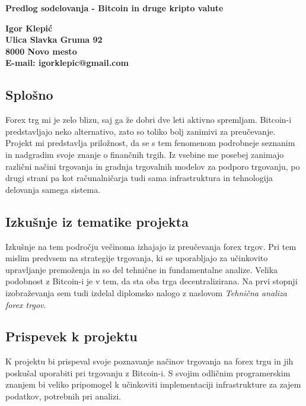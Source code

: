 \documentclass[10pt]{article}
\date{}
\begin{document}
\begin{flushleft}

{\Large
\textbf{Predlog sodelovanja - Bitcoin in druge kripto valute}
}


\vspace{5mm}

\bf Igor Klepić\\Ulica Slavka Gruma 92\\8000 Novo mesto
\\
E-mail: igorklepic@gmail.com
\end{flushleft}

\subsection*{Splošno}

Forex trg mi je zelo blizu, saj ga že dobri dve leti aktivno spremljam. Bitcoin-i predstavljajo neko alternativo, zato so toliko bolj zanimivi za preučevanje. Projekt mi predstavlja priložnost, da se s tem fenomenom podrobneje seznanim in nadgradim svoje znanje o finančnih trgih. Iz vsebine me posebej zanimajo različni načini trgovanja in gradnja trgovalnih modelov za podporo trgovanju, po drugi strani pa kot računalničarja tudi sama infrastruktura in tehnologija delovanja samega sistema.

\subsection*{Izkušnje iz tematike projekta}

Izkušnje na tem področju večinoma izhajajo iz preučevanja forex trgov. Pri tem mislim predvsem na strategije trgovanja, ki se uporabljajo za učinkovito upravljanje premoženja in so del tehnične in fundamentalne analize. Velika podobnost z Bitcoin-i je v tem, da sta oba trga decentralizirana. Na prvi stopnji izobraževanja sem tudi izdelal diplomsko nalogo z naslovom \textit{Tehnična analiza forex trgov}.

\subsection*{Prispevek k projektu}

K projektu bi prispeval svoje poznavanje načinov trgovanja na forex trgu in jih poskušal uporabiti pri trgovanju z Bitcoin-i. S svojim odličnim programerskim znanjem bi veliko pripomogel k učinkoviti implementaciji infrastrukture za zajem podatkov, potrebnih pri analizi. 
\end{document}
